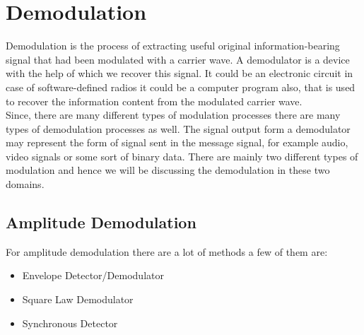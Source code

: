 \documentclass[12pt,a4paper]{article}%
\begin{document}
	\section{Demodulation}
	\begin{flushleft}
		Demodulation is the process of extracting useful original information-bearing signal that had been modulated with a carrier wave. A demodulator is a device with the help of which we recover this signal. It could be an electronic circuit in case of software-defined radios it could be a computer program also, that is used to recover the information content from the modulated carrier wave.\\\smallskip
		Since, there are many different types of modulation processes there are many types of demodulation processes as well. The signal output form a demodulator may represent the form of signal sent in the message signal, for example audio, video signals or some sort of binary data. There are mainly two different types of modulation and hence we will be discussing the demodulation in these two domains.
		\subsection{Amplitude Demodulation}
		\begin{flushleft}
			For amplitude demodulation there are a lot of methods a few of them are:
			\begin{itemize}
				\item{Envelope Detector/Demodulator}
				\item{Square Law Demodulator}
				\item{Synchronous Detector}
			\end{itemize}

\end{flushleft}
\end{flushleft}
\end{document}
